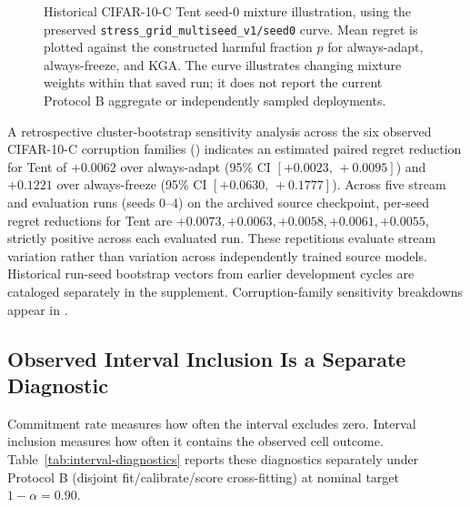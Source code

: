 \begin{figure}[t]
  \centering
  \caption{Historical CIFAR-10-C Tent seed-0 mixture illustration, using the preserved
  \texttt{stress\_grid\_multiseed\_v1/seed0} curve. Mean regret is plotted against the
  constructed harmful fraction $p$ for always-adapt, always-freeze, and KGA. The curve
  illustrates changing mixture weights within that saved run; it does not report the current
  Protocol B aggregate or independently sampled deployments.}
  \label{fig:decisive-pareto}
\end{figure}

A retrospective cluster-bootstrap sensitivity analysis across the six observed CIFAR-10-C corruption
families ()
indicates an estimated paired regret reduction for Tent of $+0.0062$ over always-adapt
(95\% CI $[+0.0023,\,+0.0095]$) and $+0.1221$ over always-freeze (95\% CI $[+0.0630,\,+0.1777]$).
Across five stream and evaluation runs (seeds 0--4) on the archived source checkpoint, per-seed regret reductions for Tent are $+0.0073, +0.0063, +0.0058, +0.0061, +0.0055$, strictly positive across each evaluated run. These repetitions evaluate stream variation rather than variation across independently trained source models. Historical run-seed bootstrap vectors from earlier development cycles are cataloged separately in the supplement. Corruption-family sensitivity breakdowns appear in .

\subsection{Observed Interval Inclusion Is a Separate Diagnostic}
\label{sec:interval-diagnostics}

Commitment rate measures how often the interval excludes zero. Interval inclusion measures how
often it contains the observed cell outcome. Table~\ref{tab:interval-diagnostics} reports these
diagnostics separately under Protocol B (disjoint fit/calibrate/score cross-fitting) at nominal target
$1-\alpha=0.90$.

\begin{table}[t]
\centering
\footnotesize
\caption{Retrospective interval diagnostics for the controlled cells under Protocol B (disjoint fit/calibrate/score cross-fitting), at nominal target
$1-\alpha=0.90$. Observed inclusion concerns $\Delta^{\mathrm{cell}}$.
Candidate/family breakdowns and directional-error denominators are provided in the supplement.}
\label{tab:interval-diagnostics}
\resizebox{\textwidth}{!}{}
\end{table}

